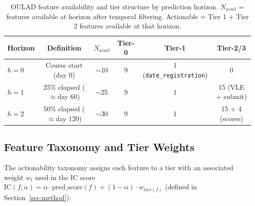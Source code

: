 \documentclass[a4paper,fleqn]{cas-sc}
\begin{document}
\begin{table}[ht]
\centering
\caption{OULAD feature availability and tier structure by prediction horizon.
$N_{avail}$ = features available at horizon after temporal filtering.
Actionable = Tier 1 + Tier 2 features available at that horizon.}
\label{tab:datasets}
\setlength{\tabcolsep}{5pt}
\begin{tabular}{lccccc}
\hline
\textbf{Horizon} & \textbf{Definition} & \textbf{$N_{avail}$} & \textbf{Tier-0} & \textbf{Tier-1} & \textbf{Tier-2/3}\\
\hline
$h=0$ & Course start (day 0)   & $\sim$10 & 9 & 1 (\texttt{date\_registration}) & 0 \\
$h=1$ & 25\% elapsed ($\approx$day 60) & $\sim$25 & 9 & 1 & 15 (VLE + submit) \\
$h=2$ & 50\% elapsed ($\approx$day 120) & $\sim$30 & 9 & 1 & 15 + 4 (scores) \\
\hline
\end{tabular}
\end{table}

\subsection{Feature Taxonomy and Tier Weights}

The actionability taxonomy assigns each feature to a tier with an associated
weight $w_t$ used in the IC score $\text{IC}(f,\alpha) = \alpha\cdot\text{pred\_score}(f)
+ (1-\alpha)\cdot w_{tier(f)}$ (defined in Section~\ref{sec:method}):
\end{document}
